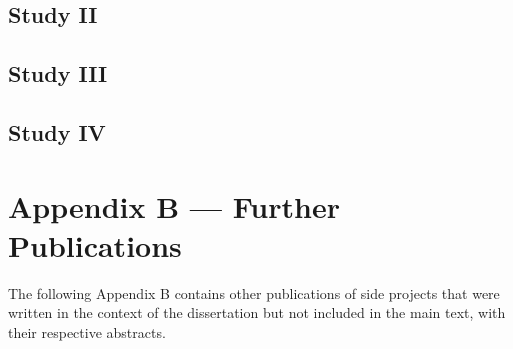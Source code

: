 \documentclass[
]{scrbook}
\begin{document}


\newpage

\section*{Study II}\label{studyII}

\begin{minipage}{\textwidth}

\end{minipage}



\newpage

\section*{Study III}\label{studyIII}

\begin{minipage}{\textwidth}

\end{minipage}



\newpage

\section*{Study IV}\label{studyIV}

\begin{minipage}{\textwidth}

\end{minipage}



\chapter*{Appendix B --- Further Publications}\label{appendixB}

The following Appendix B contains other publications of side projects that were written in the context of the dissertation but not included in the main text, with their respective abstracts.
\end{document}

